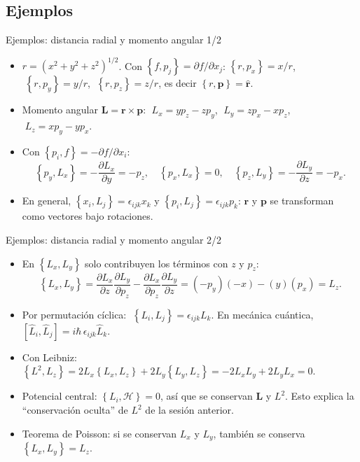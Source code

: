 \documentclass[spanish]{beamer}
\newcommand{\Ham}{\mathcal{H}}               %
\newcommand{\pd}[2]{\frac{\partial #1}{\partial #2}}
\newcommand{\pb}[2]{\left\{#1,#2\right\}}    %
\begin{document}
\subsection{Ejemplos}
\begin{frame}{Ejemplos: distancia radial y momento angular 1/2}
\begin{itemize}[<+->]
  \item $r=(x^2+y^2+z^2)^{1/2}$. Con $\pb{f}{p_j}=\partial f/\partial x_j$:
        $\pb{r}{p_x}=x/r$, $\;\pb{r}{p_y}=y/r$, $\;\pb{r}{p_z}=z/r$, es decir
        $\pb{r}{\mathbf p}=\hat{\mathbf r}$.
  \item Momento angular $\mathbf L=\mathbf r\times\mathbf p$:
        $\;L_x=yp_z-zp_y$, $\;L_y=zp_x-xp_z$, $\;L_z=xp_y-yp_x$.
  \item Con $\pb{p_i}{f}=-\partial f/\partial x_i$:
        \[
          \pb{p_y}{L_x}=-\pd{L_x}{y}=-p_z,\quad
          \pb{p_x}{L_x}=0,\quad
          \pb{p_z}{L_y}=-\pd{L_y}{z}=-p_x .
        \]
  \item En general, $\pb{x_i}{L_j}=\epsilon_{ijk}x_k$ y $\pb{p_i}{L_j}=\epsilon_{ijk}p_k$:
        $\mathbf r$ y $\mathbf p$ se transforman como vectores bajo rotaciones.
\end{itemize}
\end{frame}

\begin{frame}{Ejemplos: distancia radial y momento angular 2/2}
\begin{itemize}[<+->]
  \item En $\pb{L_x}{L_y}$ solo contribuyen los términos con $z$ y $p_z$:
        \[
          \pb{L_x}{L_y}=\pd{L_x}{z}\pd{L_y}{p_z}-\pd{L_x}{p_z}\pd{L_y}{z}
          =(-p_y)(-x)-(y)(p_x)=L_z .
        \]
  \item Por permutación cíclica: $\;\pb{L_i}{L_j}=\epsilon_{ijk}L_k$.
        En mecánica cuántica, $[\hat L_i,\hat L_j]=i\hbar\,\epsilon_{ijk}\hat L_k$.
  \item Con Leibniz: $\pb{L^2}{L_z}=2L_x\pb{L_x}{L_z}+2L_y\pb{L_y}{L_z}
        =-2L_xL_y+2L_yL_x=0$.
  \item Potencial central: $\pb{L_i}{\Ham}=0$, así que se conservan $\mathbf L$ y $L^2$.
        Esto explica la “conservación oculta” de $L^2$ de la sesión anterior.
  \item Teorema de Poisson: si se conservan $L_x$ y $L_y$, también se conserva
        $\pb{L_x}{L_y}=L_z$.
\end{itemize}
\end{frame}
\end{document}
